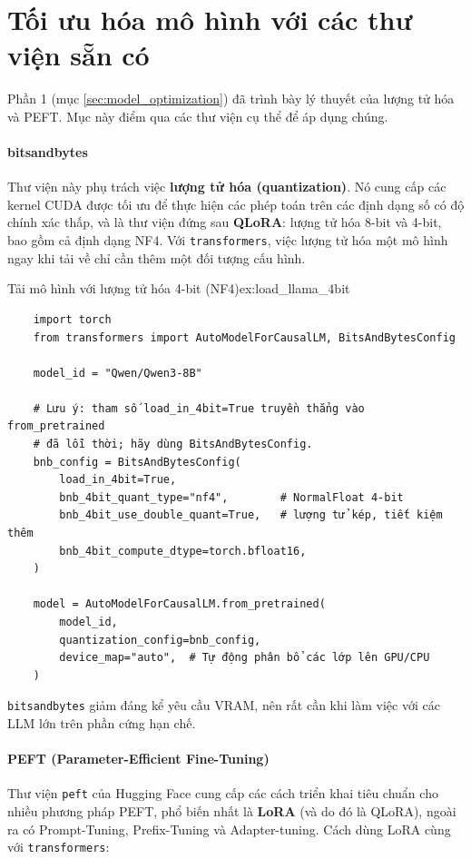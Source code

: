 
\section{Tối ưu hóa mô hình với các thư viện sẵn có}
\label{sec:model_optimization_libraries}
Phần 1 (mục \ref{sec:model_optimization}) đã trình bày lý thuyết của lượng tử hóa và PEFT. Mục này điểm qua các thư viện cụ thể để áp dụng chúng.

\paragraph{bitsandbytes}
Thư viện này phụ trách việc \textbf{lượng tử hóa (quantization)}. Nó cung cấp các kernel CUDA được tối ưu để thực hiện các phép toán trên các định dạng số có độ chính xác thấp, và là thư viện đứng sau \textbf{QLoRA}: lượng tử hóa 8-bit và 4-bit, bao gồm cả định dạng NF4. Với \texttt{transformers}, việc lượng tử hóa một mô hình ngay khi tải về chỉ cần thêm một đối tượng cấu hình.

\begin{example}{Tải mô hình với lượng tử hóa 4-bit (NF4)}{ex:load_llama_4bit}
    \begin{verbatim}
    import torch
    from transformers import AutoModelForCausalLM, BitsAndBytesConfig

    model_id = "Qwen/Qwen3-8B"

    # Lưu ý: tham số load_in_4bit=True truyền thẳng vào from_pretrained
    # đã lỗi thời; hãy dùng BitsAndBytesConfig.
    bnb_config = BitsAndBytesConfig(
        load_in_4bit=True,
        bnb_4bit_quant_type="nf4",        # NormalFloat 4-bit
        bnb_4bit_use_double_quant=True,   # lượng tử kép, tiết kiệm thêm
        bnb_4bit_compute_dtype=torch.bfloat16,
    )

    model = AutoModelForCausalLM.from_pretrained(
        model_id,
        quantization_config=bnb_config,
        device_map="auto",  # Tự động phân bổ các lớp lên GPU/CPU
    )
    \end{verbatim}
\end{example}

\texttt{bitsandbytes} giảm đáng kể yêu cầu VRAM, nên rất cần khi làm việc với các LLM lớn trên phần cứng hạn chế.

\paragraph{PEFT (Parameter-Efficient Fine-Tuning)}
Thư viện \texttt{peft} của Hugging Face cung cấp các cách triển khai tiêu chuẩn cho nhiều phương pháp PEFT, phổ biến nhất là \textbf{LoRA} (và do đó là QLoRA), ngoài ra có Prompt-Tuning, Prefix-Tuning và Adapter-tuning. Cách dùng LoRA cùng với \texttt{transformers}:

